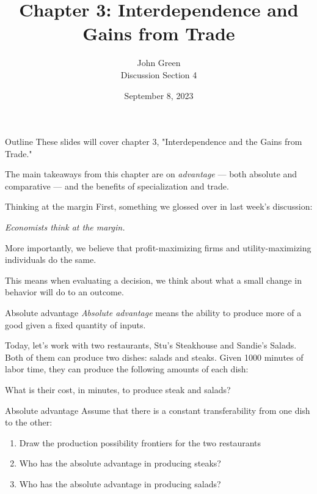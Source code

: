 \documentclass[aspectratio=169]{beamer}
\title{Chapter 3: Interdependence and Gains from Trade}
\author{John Green \\
Discussion Section 4}
\date{September 8, 2023}
\begin{document}
\begin{frame}
    \titlepage 
\end{frame}

\begin{frame}{Outline}
    These slides will cover chapter 3, "Interdependence and the Gains from Trade."

    \medskip

    The main takeaways from this chapter are on \textit{advantage} --- both absolute and comparative --- and the benefits of specialization and trade.
\end{frame}

\begin{frame}{Thinking at the margin}
    First, something we glossed over in last week's discussion:

    \begin{center}
        \textit{Economists think at the margin.}
    \end{center}

    \medskip

    More importantly, we believe that profit-maximizing firms and utility-maximizing individuals do the same.

    \medskip

    This means when evaluating a decision, we think about what a small change in behavior will do to an outcome.

\end{frame}

\begin{frame}{Absolute advantage}
    \textit{Absolute advantage} means the ability to produce more of a good given a fixed quantity of inputs.
    
    \medskip

    Today, let's work with two restaurants, Stu's Steakhouse and Sandie's Salads. Both of them can produce two dishes: salads and steaks. Given 1000 minutes of labor time, they can produce the following amounts of each dish:

    

    What is their cost, in minutes, to produce steak and salads?
\end{frame} 

\begin{frame}{Absolute advantage}
    Assume that there is a constant transferability from one dish to the other:
    \begin{enumerate}
        \item Draw the production possibility frontiers for the two restaurants
        \item Who has the absolute advantage in producing steaks?
        \item Who has the absolute advantage in producing salads?
    \end{enumerate}
\end{frame} 
\end{document}
